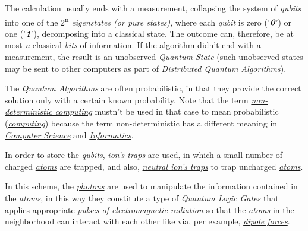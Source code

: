 \documentclass[conference]{IEEEtran}
\begin{document}
 \vspace{4pt}
 
 The calculation usually ends with a measurement, collapsing the system of \href{https://en.wikipedia.org/wiki/Qubit}{\textit{qubits}} into one of the 2\textsuperscript{n} \href{https://en.wikipedia.org/wiki/Quantum_state#Pure_states}{\textit{eigenstates (or pure states)}}, where each \href{https://en.wikipedia.org/wiki/Qubit}{\textit{qubit}} is zero ('$\textit{\textbf{0}}$') or one ('$\textit{\textbf{1}}$'), decomposing into a classical state. The outcome can, therefore, be at most \textit{n} classical \href{https://en.wikipedia.org/wiki/Bit}{\textit{bits}} of information. If the algorithm didn't end with a measurement, the result is an unobserved \href{https://en.wikipedia.org/wiki/Quantum_state}{\textit{Quantum State}} (such unobserved states may be sent to other computers as part of \textit{Distributed Quantum Algorithms}).

\vspace{4pt}

The \textit{Quantum Algorithms} are often probabilistic, in that they provide the correct solution only with a certain known probability. Note that the term \href{https://en.wikipedia.org/wiki/Non-deterministic_Turing_machine}{\textit{non-deterministic computing}} mustn't be used in that case to mean probabilistic (\href{https://en.wikipedia.org/wiki/Computing}{\textit{computing}}) because the term non-deterministic has a different meaning in \href{https://en.wikipedia.org/wiki/Computer_science}{\textit{Computer Science}} and \href{https://en.wikipedia.org/wiki/Informatics}{\textit{Informatics}}.

\vspace{4pt}

In order to store the \href{https://en.wikipedia.org/wiki/Qubit}{\textit{qubits}}, \href{https://en.wikipedia.org/wiki/Ion_trap}{\textit{ion's traps}} are used, in which a small number of charged \href{https://en.wikipedia.org/wiki/Atom}{\textit{atoms}} are trapped, and also, \href{https://en.wikipedia.org/wiki/Magnetic_trap_(atoms)}{\textit{neutral ion's traps}} to trap uncharged \href{https://en.wikipedia.org/wiki/Atom}{\textit{atoms}}.

\newpage

In this scheme, the \href{https://en.wikipedia.org/wiki/Photon}{\textit{photons}} are used to manipulate the information contained in the \href{https://en.wikipedia.org/wiki/Atom}{\textit{atoms}}, in this way they constitute a type of \href{https://en.wikipedia.org/wiki/Quantum_logic_gate}{\textit{Quantum Logic Gates}} that applies appropriate \textit{pulses of \href{https://en.wikipedia.org/wiki/Electromagnetic_radiation}{electromagnetic radiation}} so that the \href{https://en.wikipedia.org/wiki/Atom}{\textit{atoms}} in the neighborhood can interact with each other like via, per example, \href{https://en.wikipedia.org/wiki/Intermolecular_force}{\textit{dipole forces}}.
\end{document}
